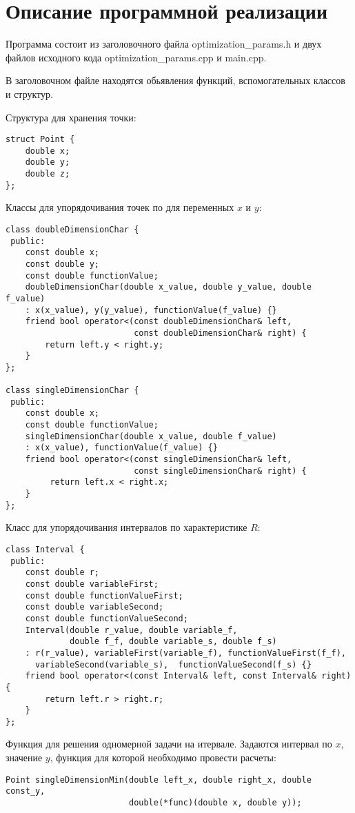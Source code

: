 \documentclass{report}
\begin{document}
\section*{Описание программной реализации}
Программа состоит из заголовочного файла optimization\_params.h и двух файлов исходного кода optimization\_params.cpp и main.cpp.
\par В заголовочном файле находятся обьявления функций, вспомогательных классов и структур.
\par Структура для хранения точки:
\begin{lstlisting}
struct Point {
    double x;
    double y;
    double z;
};
\end{lstlisting}
\par Классы для упорядочивания точек по для переменных $x$ и $y$:
\begin{lstlisting}
class doubleDimensionChar {
 public:
    const double x;
    const double y;
    const double functionValue;
    doubleDimensionChar(double x_value, double y_value, double f_value)
    : x(x_value), y(y_value), functionValue(f_value) {}
    friend bool operator<(const doubleDimensionChar& left,
                          const doubleDimensionChar& right) {
        return left.y < right.y;
    }
};

class singleDimensionChar {
 public:
    const double x;
    const double functionValue;
    singleDimensionChar(double x_value, double f_value)
    : x(x_value), functionValue(f_value) {}
    friend bool operator<(const singleDimensionChar& left,
                          const singleDimensionChar& right) {
         return left.x < right.x;
    }
};
\end{lstlisting}
\newpage

\par Класс для упорядочивания интервалов по характеристике $R$:
\begin{lstlisting}
class Interval {
 public:
    const double r;
    const double variableFirst;
    const double functionValueFirst;
    const double variableSecond;
    const double functionValueSecond;
    Interval(double r_value, double variable_f,
             double f_f, double variable_s, double f_s)
    : r(r_value), variableFirst(variable_f), functionValueFirst(f_f),
      variableSecond(variable_s),  functionValueSecond(f_s) {}
    friend bool operator<(const Interval& left, const Interval& right) {
        return left.r > right.r;
    }
};
\end{lstlisting}
\par Функция для решения одномерной задачи на итервале. Задаются интервал по $x$, значение $y$, функция для которой необходимо провести расчеты:
\begin{lstlisting}
Point singleDimensionMin(double left_x, double right_x, double const_y,
                         double(*func)(double x, double y));
\end{lstlisting}
\end{document}
